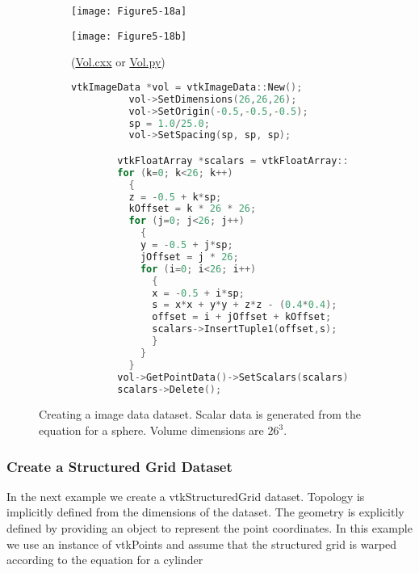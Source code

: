 \begin{figure}[!htb]
	\begin{subfigure}[h]{0.48\linewidth}
		\texttt{[image: Figure5-18a]}
		\caption*{}
		\label{fig:Figure5-18a}
	\end{subfigure}
	\hfill
	\begin{subfigure}[h]{0.48\linewidth}
		\texttt{[image: Figure5-18b]}
		\caption*{(\href{https://lorensen.github.io/VTKExamples/site/Cxx/StructuredPoints/Vol/}{Vol.cxx} or \href{https://lorensen.github.io/VTKExamples/site/Python/StructuredPoints/Vol/}{Vol.py})}
		\label{fig:Figure5-18b}
	\end{subfigure}
	\hfill
	\begin{subfigure}[h]{0.96\linewidth}
		\caption*{}
	\end{subfigure}
	\hfill
	\begin{subfigure}[h]{0.96\linewidth}
		\begin{lstlisting}[language=C++, caption={}]
		vtkImageData *vol = vtkImageData::New();
		  vol->SetDimensions(26,26,26);
		  vol->SetOrigin(-0.5,-0.5,-0.5);
		  sp = 1.0/25.0;
		  vol->SetSpacing(sp, sp, sp);

		vtkFloatArray *scalars = vtkFloatArray::New()
		for (k=0; k<26; k++)
		  {
		  z = -0.5 + k*sp;
		  kOffset = k * 26 * 26;
		  for (j=0; j<26; j++)
		    {
		    y = -0.5 + j*sp;
		    jOffset = j * 26;
		    for (i=0; i<26; i++)
		      {
		      x = -0.5 + i*sp;
		      s = x*x + y*y + z*z - (0.4*0.4);
		      offset = i + jOffset + kOffset;
		      scalars->InsertTuple1(offset,s);
		      }
		    }
		  }
		vol->GetPointData()->SetScalars(scalars);
		scalars->Delete();
		\end{lstlisting}
		\caption*{}
		\label{fig:Figure5-18c}
	\end{subfigure}
	\caption{Creating a image data dataset. Scalar data is generated from the equation for a sphere. Volume dimensions are $26^3$.}\label{fig:Figure5-18}
\end{figure}

\subsubsection{Create a Structured Grid Dataset}

In the next example we create a vtkStructuredGrid dataset. Topology is implicitly defined from the dimensions of the dataset. The geometry is explicitly defined by providing an object to represent the point coordinates. In this example we use an instance of vtkPoints and assume that the structured grid is warped according to the equation for a cylinder

